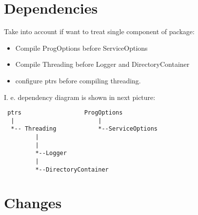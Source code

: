\documentclass[10pt]{article}
\begin{document}
\section{ Dependencies }

Take into account if want to treat single component of package:
\begin{itemize}
\item Compile ProgOptions before ServiceOptions
\item Compile Threading before Logger and DirectoryContainer
\item configure ptrs before compiling threading.
\end{itemize}

I. e. dependency diagram is shown in next picture:
\begin{verbatim}
 ptrs                  ProgOptions
  |                        |
  *-- Threading            *--ServiceOptions
         |
         |
         *--Logger
         |
         *--DirectoryContainer
\end{verbatim}

\section{ Changes }
\end{document}
